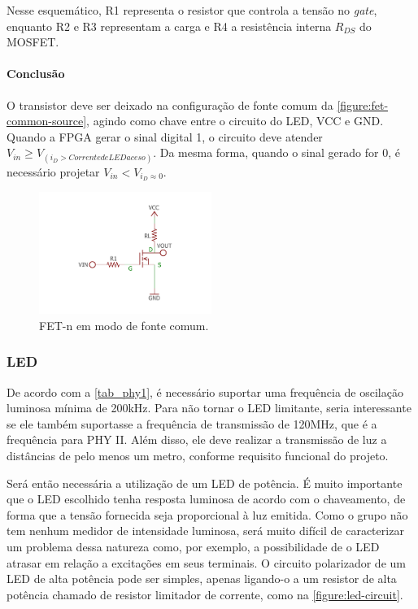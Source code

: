 	Nesse esquemático, R1 representa o resistor que controla a tensão no \textit{gate}, enquanto R2 e R3 representam a carga e R4 a resistência interna $R_{DS}$ do MOSFET.

	\paragraph{Conclusão}

	O transistor deve ser deixado na configuração de fonte comum da \autoref{figure:fet-common-source}, agindo como chave entre o circuito do LED, VCC e GND. Quando a FPGA gerar o sinal digital 1, o circuito deve atender $V_{in} \geq V_{(i_{D} > Corrente de LED aceso)}$. Da mesma forma, quando o sinal gerado for 0, é necessário projetar  $V_{in} < V_{i_{D} \approx 0}$.

	\begin{figure}[h]
		\caption{\label{figure:fet-common-source}FET-n em modo de fonte comum.}
		\centering
		\includegraphics[width=0.5\textwidth, trim={0cm 2cm 0cm 2cm}, clip]{circuits/mosfet_example.pdf}
	\end{figure}

	\subsubsection{LED}\label{method-hardware-led}

	De acordo com a \autoref{tab_phy1}, é necessário suportar uma frequência de oscilação luminosa mínima de 200kHz. Para não tornar o LED limitante, seria interessante se ele também suportasse a frequência de transmissão de 120MHz, que é a frequência para PHY II. Além disso, ele deve realizar a transmissão de luz a distâncias de pelo menos um metro, conforme requisito funcional do projeto.

	Será então necessária a utilização de um LED de potência. É muito importante que o LED escolhido tenha resposta luminosa de acordo com o chaveamento, de forma que a tensão fornecida seja proporcional à luz emitida. Como o grupo não tem nenhum medidor de intensidade luminosa, será muito difícil de caracterizar um problema dessa natureza como, por exemplo, a possibilidade de o LED atrasar em relação a excitações em seus terminais. O circuito polarizador de um LED de alta potência pode ser simples, apenas ligando-o a um resistor de alta potência chamado de resistor limitador de corrente, como na \autoref{figure:led-circuit}.

